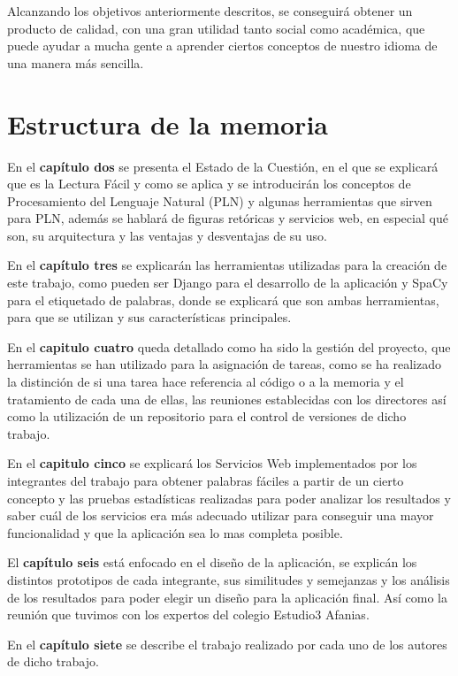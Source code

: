 Alcanzando los objetivos anteriormente descritos, se conseguirá obtener un producto de calidad, con una gran utilidad tanto social como académica, que puede ayudar a mucha gente a aprender ciertos conceptos de nuestro idioma de una manera más sencilla.
	
	
\section{Estructura de la memoria}
\label{cap:sec:estructuramemoria}


En el \textbf{capítulo dos} se presenta el Estado de la Cuestión, en el que se explicará que es la Lectura Fácil y como se aplica y se introducirán los conceptos de Procesamiento del Lenguaje Natural (PLN) y algunas herramientas que sirven para PLN, además se hablará de figuras retóricas y servicios web, en especial qué son, su arquitectura y las ventajas y desventajas de su uso.


En el \textbf{capítulo tres} se explicarán las herramientas utilizadas para la creación de este trabajo, como pueden ser Django para el desarrollo de la aplicación y SpaCy para el etiquetado de palabras, donde se explicará que son ambas herramientas, para que se utilizan y sus características principales.

En el \textbf{capitulo cuatro} queda detallado como ha sido la gestión del proyecto, que herramientas se han utilizado para la asignación de tareas, como se ha realizado la distinción de si una tarea hace referencia al código o a la memoria y el tratamiento de cada una de ellas, las reuniones establecidas con los directores así como la utilización de un repositorio para el control de versiones de dicho trabajo.

En el \textbf{capitulo cinco} se explicará los Servicios Web implementados por los integrantes del trabajo para obtener palabras fáciles a partir de un cierto concepto y las pruebas estadísticas realizadas para poder analizar los resultados y saber cuál de los servicios era más adecuado utilizar para conseguir una mayor funcionalidad y que la aplicación sea lo mas completa posible. 

El \textbf{capítulo seis} está enfocado en el diseño de la aplicación, se explicán los distintos prototipos de cada integrante, sus similitudes y semejanzas y los análisis de los resultados para poder elegir un diseño para la aplicación final. Así como la reunión que tuvimos con los expertos del colegio Estudio3 Afanias.

En el \textbf{capítulo siete} se describe el trabajo realizado por cada uno de los autores de dicho trabajo.
